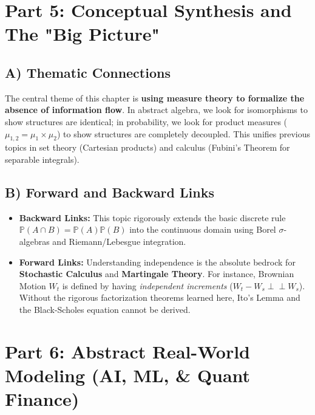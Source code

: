 \documentclass[11pt, a4paper]{article}
\theoremstyle{definition}
\theoremstyle{remark}
\newcommand{\Prob}{\mathbb{P}}
\newcommand{\indep}{\perp\!\!\!\perp}
\begin{document}
\newpage
\section{Part 5: Conceptual Synthesis and The "Big Picture"}

\subsection{A) Thematic Connections}
The central theme of this chapter is \textbf{using measure theory to formalize the absence of information flow}. In abstract algebra, we look for isomorphisms to show structures are identical; in probability, we look for product measures ($\mu_{1,2} = \mu_1 \times \mu_2$) to show structures are completely decoupled. This unifies previous topics in set theory (Cartesian products) and calculus (Fubini's Theorem for separable integrals).

\subsection{B) Forward and Backward Links}
\begin{itemize}
    \item \textbf{Backward Links:} This topic rigorously extends the basic discrete rule $\Prob(A \cap B) = \Prob(A)\Prob(B)$ into the continuous domain using Borel $\sigma$-algebras and Riemann/Lebesgue integration.
    \item \textbf{Forward Links:} Understanding independence is the absolute bedrock for \textbf{Stochastic Calculus} and \textbf{Martingale Theory}. For instance, Brownian Motion $W_t$ is defined by having \textit{independent increments} ($W_t - W_s \indep W_s$). Without the rigorous factorization theorems learned here, Ito's Lemma and the Black-Scholes equation cannot be derived.
\end{itemize}

\section{Part 6: Abstract Real-World Modeling (AI, ML, \& Quant Finance)}
\end{document}
